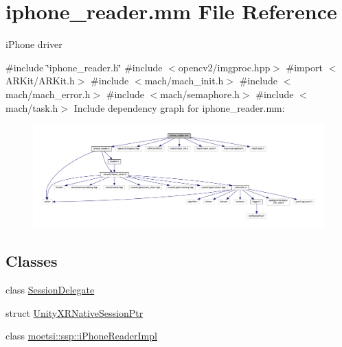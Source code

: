 \hypertarget{iphone__reader_8mm}{}\section{iphone\+\_\+reader.\+mm File Reference}
\label{iphone__reader_8mm}


i\+Phone driver  


{\ttfamily \#include \char`\"{}iphone\+\_\+reader.\+h\char`\"{}}\newline
{\ttfamily \#include $<$opencv2/imgproc.\+hpp$>$}\newline
{\ttfamily \#import $<$A\+R\+Kit/\+A\+R\+Kit.\+h$>$}\newline
{\ttfamily \#include $<$mach/mach\+\_\+init.\+h$>$}\newline
{\ttfamily \#include $<$mach/mach\+\_\+error.\+h$>$}\newline
{\ttfamily \#include $<$mach/semaphore.\+h$>$}\newline
{\ttfamily \#include $<$mach/task.\+h$>$}\newline
Include dependency graph for iphone\+\_\+reader.\+mm\+:
\nopagebreak
\begin{figure}[H]
\begin{center}
\leavevmode
\includegraphics[width=350pt]{iphone__reader_8mm__incl}
\end{center}
\end{figure}
\subsection*{Classes}
\begin{DoxyCompactItemize}
\item 
class \hyperlink{interfaceSessionDelegate}{Session\+Delegate}
\item 
struct \hyperlink{structUnityXRNativeSessionPtr}{Unity\+X\+R\+Native\+Session\+Ptr}
\item 
class \hyperlink{classmoetsi_1_1ssp_1_1iPhoneReaderImpl}{moetsi\+::ssp\+::i\+Phone\+Reader\+Impl}
\end{DoxyCompactItemize}
